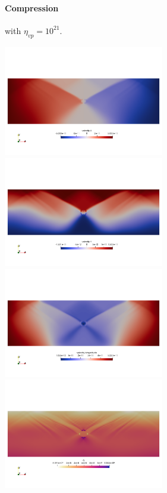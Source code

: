 \newpage
\paragraph{Compression} with $\eta_{vp}=10^{21}$.

\begin{center}
\includegraphics[width=7cm]{python_codes/fieldstone_70/compression/u}
\includegraphics[width=7cm]{python_codes/fieldstone_70/compression/v}\\
\includegraphics[width=7cm]{python_codes/fieldstone_70/compression/vel}
\includegraphics[width=7cm]{python_codes/fieldstone_70/compression/q}\\

\end{center}
